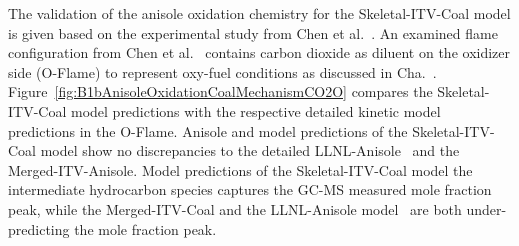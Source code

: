 \begin{refsection}
The validation of the anisole oxidation chemistry for the Skeletal-ITV-Coal model is given based on the experimental study from Chen et al.~\cite{Chen2022}. An examined flame configuration from Chen et al.~\cite{Chen2022} contains carbon dioxide as diluent on the oxidizer side (O-Flame) to represent oxy-fuel conditions as discussed in Cha.~. Figure~\ref{fig:B1bAnisoleOxidationCoalMechanismCO2O} compares the Skeletal-ITV-Coal model predictions with the respective detailed kinetic model predictions in the O-Flame. Anisole and  model predictions of the Skeletal-ITV-Coal model show no discrepancies to the detailed LLNL-Anisole~\cite{Wagnon2018} and the Merged-ITV-Anisole. Model predictions of the Skeletal-ITV-Coal model the intermediate hydrocarbon species  captures the GC-MS measured mole fraction peak, while the Merged-ITV-Coal and the LLNL-Anisole model~\cite{Wagnon2018} are both under-predicting the mole fraction peak.



\end{refsection}
